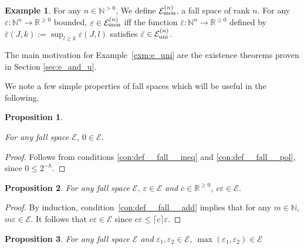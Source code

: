 \documentclass{article}
\numberwithin{equation}{section}
\theoremstyle{definition}
\newtheorem{example}{Example}[section]
\theoremstyle{plain}
\newtheorem{proposition}{Proposition}[section]
\newcommand{\Nats}{\mathbb{N}}
\newcommand{\Reals}{\mathbb{R}}
\newcommand{\NatFun}{\Nats^n \rightarrow}
\newcommand{\Ceil}[1]{\lceil #1 \rceil}
\newcommand{\Fall}{\mathcal{E}}
\newcommand{\FallU}{{\Fall_{\textnormal{uni}}^{(n)}}}
\newcommand{\FallM}{\Fall_{\textnormal{mon}}^{(n)}}
\begin{document}
\begin{samepage}
\begin{example}

For any ${n \in \Nats^{>0}}$, We define ${\FallM}$, a fall space of rank ${n}$. For any ${\varepsilon: \NatFun \Reals^{\geq 0}}$ bounded, $\varepsilon \in \FallM$ iff the function ${\bar{\varepsilon}: \NatFun \Reals^{\geq 0}}$ defined by ${\bar{\varepsilon}(J,k):=\sup_{l \geq k} \varepsilon(J,l)}$ satisfies ${\bar{\varepsilon} \in \FallU}$.

\end{example}
\end{samepage}

The main motivation for Example~\ref{exm:e_uni} are the existence theorems proven in Section \ref{sec:e_and_u}.

We note a few simple properties of fall spaces which will be useful in the following.

\begin{proposition}
\label{prp:err_spc_zero}

For any fall space $\Fall$, $0 \in \Fall$.

\end{proposition}

\begin{proof}

Follows from conditions \ref{con:def__fall__ineq} and \ref{con:def__fall__pol}, since $0 \leq 2^{-h}$.
\end{proof}

\begin{proposition}

For any fall space $\Fall$, $\varepsilon \in \Fall$ and $c \in \Reals^{\geq 0}$, $c \varepsilon \in \Fall$.

\end{proposition}

\begin{proof}

By induction, condition~\ref{con:def__fall__add} implies that for any $m \in \Nats$, $m\varepsilon \in \Fall$. It follows that $c\varepsilon \in \Fall$ since $c\varepsilon \leq \Ceil{c}\varepsilon$.
\end{proof}

\begin{proposition}

For any fall space $\Fall$ and $\varepsilon_1, \varepsilon_2 \in \Fall$, $\max(\varepsilon_1,\varepsilon_2) \in \Fall$

\end{proposition}
\end{document}
